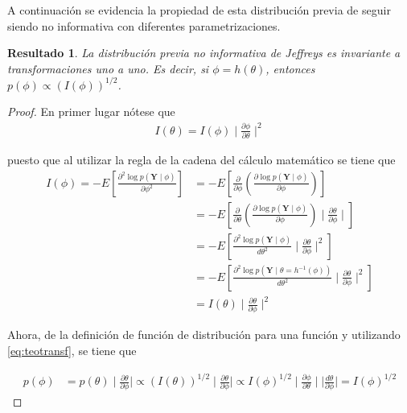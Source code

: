 \documentclass[
  10pt,
  spanish,
]{book}
\newtheorem{proposition}{Resultado}[chapter]
\theoremstyle{definition}
\theoremstyle{definition}
\theoremstyle{definition}
\theoremstyle{definition}
\theoremstyle{remark}
\begin{document}
A continuación se evidencia la propiedad de esta distribución previa de
seguir siendo no informativa con diferentes parametrizaciones.

\begin{proposition}
\protect\hypertarget{prp:unnamed-chunk-16}{}{\label{prp:unnamed-chunk-16} }La distribución previa no informativa de Jeffreys es invariante a transformaciones uno a uno. Es decir, si \(\phi=h(\theta)\), entonces \(p(\phi)\propto(I(\phi))^{1/2}\).
\end{proposition}

\begin{proof}
{}En primer lugar nótese que
\begin{align*}
I(\theta)=I(\phi) \mid \frac{\partial\phi}{\partial\theta} \mid ^{2}
\end{align*}

puesto que al utilizar la regla de la cadena del cálculo matemático se tiene que
\begin{align*}
I(\phi)= - E\left[\frac{\partial^2 \log p(\mathbf{Y} \mid \phi)}{\partial\phi^2}\right]
&= - E\left[\frac{\partial}{\partial\phi}\left(\frac{\partial \log p(\mathbf{Y} \mid \phi)}{\partial\phi}\right)\right]\\
&= - E\left[\frac{\partial}{\partial\theta}\left(\frac{\partial \log p(\mathbf{Y} \mid \phi)}{\partial\phi}\right) \mid \frac{\partial\theta}{\partial\phi} \mid \right]\\
&= - E\left[\frac{\partial^2 \log p(\mathbf{Y} \mid \phi)}{d\theta^2} \mid \frac{\partial\theta}{\partial\phi} \mid ^{2}\right]\\
&= - E\left[\frac{\partial^2 \log p(\mathbf{Y} \mid \theta =h^{-1}(\phi))}{d\theta^2} \mid \frac{\partial\theta}{\partial\phi} \mid ^{2}\right]\\
&= I(\theta) \mid \frac{\partial\theta}{\partial\phi} \mid ^{2}
\end{align*}

Ahora, de la definición de función de distribución para una función y utilizando \eqref{eq:teotransf}, se tiene que

\begin{align*}
p(\phi)&=p(\theta) \mid \frac{\partial\theta}{\partial\phi} \mid
\propto (I(\theta))^{1/2} \mid \frac{\partial\theta}{\partial\phi} \mid
\propto I(\phi)^{1/2} \mid \frac{\partial\phi}{\partial\theta} \mid  \mid \frac{d\theta}{\partial\phi} \mid =I(\phi)^{1/2}
\end{align*}
\end{proof}
\end{document}
